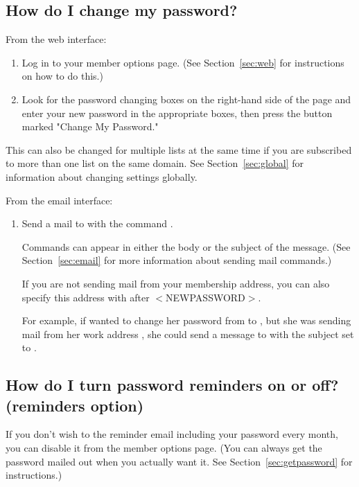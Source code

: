 \documentclass{howto}
\begin{document}
\subsection{How do I change my password?}

From the web interface:
\begin{enumerate}
	\item Log in to your member options page.  (See Section~\ref{sec:web} for 
   instructions on how to do this.)

	\item Look for the password changing boxes on the right-hand side of the
	page and enter your new password in the appropriate boxes, then press the
	button marked "Change My Password."
\end{enumerate}

This can also be changed for multiple lists at the same time if you are subscribed to 
more than one list on the same domain.  See Section~\ref{sec:global} for 
information about changing settings globally.


From the email interface:
\begin{enumerate}
	\item Send a mail to  with the command 
	.  

	Commands can appear
	in either the body or the subject of the message.  (See 
	Section~\ref{sec:email} for more information about sending mail
	commands.)  

	If you are not sending mail from your membership address, you can also
	specify this address with  after $<$NEWPASSWORD$>$.
	
	For example, if  wanted to change her 
	password from  to , but she was sending mail from 
	her work address , she could send a message
	to  with the subject set to 
	.
\end{enumerate}

\subsection{How do I turn password reminders on or off? (reminders option)}
If you don't wish to the reminder email including your password every month, 
you can disable it from the member options page.  (You can always get the
password mailed out when you actually want it.  See 
Section~\ref{sec:getpassword} for instructions.)
\end{document}
